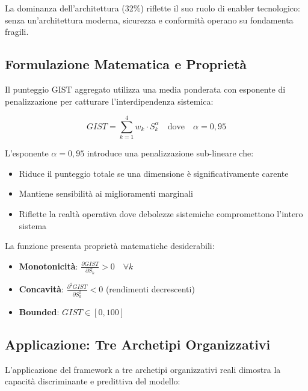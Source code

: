 La dominanza dell'architettura (32\%) riflette il suo ruolo di enabler tecnologico: senza un'architettura moderna, sicurezza e conformità operano su fondamenta fragili.

\subsection{\texorpdfstring{Formulazione Matematica e Proprietà}{5.3.2 - Formulazione Matematica}}
\label{subsec:5.3.2}

Il punteggio GIST aggregato utilizza una media ponderata con esponente di penalizzazione per catturare l'interdipendenza sistemica:

\begin{equation}
\boxed{GIST = \sum_{k=1}^{4} w_k \cdot S_k^{\alpha} \quad \text{dove} \quad \alpha = 0,95}
\end{equation}

L'esponente $\alpha = 0,95$ introduce una penalizzazione sub-lineare che:
\begin{itemize}
\item Riduce il punteggio totale se una dimensione è significativamente carente
\item Mantiene sensibilità ai miglioramenti marginali
\item Riflette la realtà operativa dove debolezze sistemiche compromettono l'intero sistema
\end{itemize}

La funzione presenta proprietà matematiche desiderabili:
\begin{itemize}
\item \textbf{Monotonicità}: $\frac{\partial GIST}{\partial S_k} > 0 \quad \forall k$
\item \textbf{Concavità}: $\frac{\partial^2 GIST}{\partial S_k^2} < 0$ (rendimenti decrescenti)
\item \textbf{Bounded}: $GIST \in [0, 100]$
\end{itemize}

\subsection{\texorpdfstring{Applicazione: Tre Archetipi Organizzativi}{5.3.3 - Tre Archetipi}}
\label{subsec:5.3.3}

L'applicazione del framework a tre archetipi organizzativi reali dimostra la capacità discriminante e predittiva del modello:

